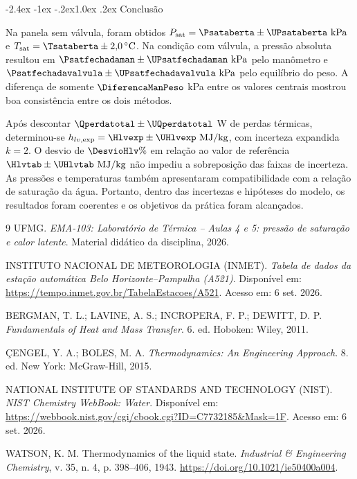\documentclass[11pt,a4paper]{article}
\makeatletter
\renewcommand\section{\@startsection{section}{1}{\z@}%
  {-2.4ex \@plus -1ex \@minus -.2ex}{1.0ex \@plus .2ex}%
  {\normalfont\large\bfseries\color{petrol}}}
\newcommand{\Psat}{P_{\mathrm{sat}}}
\newcommand{\Tsat}{T_{\mathrm{sat}}}
\makeatother
\begin{document}
\clearpage
\section{Conclusão}

Na panela sem válvula, foram obtidos
$\Psat=\Psataberta\pm\UPsataberta\ \mathrm{kPa}$ e
$\Tsat=\Tsataberta\pm2{,}0\,^{\circ}\mathrm{C}$. Na condição com válvula, a
pressão absoluta resultou em
$\Psatfechadaman\pm\UPsatfechadaman\ \mathrm{kPa}$ pelo manômetro e
$\Psatfechadavalvula\pm\UPsatfechadavalvula\ \mathrm{kPa}$ pelo equilíbrio do
peso. A diferença de somente $\DiferencaManPeso$ kPa entre os valores centrais
mostrou boa consistência entre os dois métodos.

Após descontar $\Qperdatotal\pm\UQperdatotal$ W de perdas térmicas, determinou-se
$h_{lv,\mathrm{exp}}=\Hlvexp\pm\UHlvexp\ \mathrm{MJ/kg}$, com incerteza expandida
$k=2$. O desvio de $\DesvioHlv\%$ em relação ao valor de referência
$\Hlvtab\pm\UHlvtab\ \mathrm{MJ/kg}$ não impediu a sobreposição das faixas de
incerteza. As pressões e temperaturas também apresentaram compatibilidade com a
relação de saturação da água. Portanto, dentro das incertezas e hipóteses do
modelo, os resultados foram coerentes e os objetivos da prática foram
alcançados.

\begin{thebibliography}{9}
UFMG. \textit{EMA-103: Laboratório de Térmica -- Aulas 4 e 5: pressão de
saturação e calor latente}. Material didático da disciplina, 2026.

INSTITUTO NACIONAL DE METEOROLOGIA (INMET). \textit{Tabela de dados da estação
automática Belo Horizonte--Pampulha (A521)}. Disponível em:
\url{https://tempo.inmet.gov.br/TabelaEstacoes/A521}. Acesso em: 6 set. 2026.

BERGMAN, T. L.; LAVINE, A. S.; INCROPERA, F. P.; DEWITT, D. P.
\textit{Fundamentals of Heat and Mass Transfer}. 6. ed. Hoboken: Wiley, 2011.

ÇENGEL, Y. A.; BOLES, M. A. \textit{Thermodynamics: An Engineering Approach}.
8. ed. New York: McGraw-Hill, 2015.

NATIONAL INSTITUTE OF STANDARDS AND TECHNOLOGY (NIST). \textit{NIST Chemistry
WebBook: Water}. Disponível em:
\url{https://webbook.nist.gov/cgi/cbook.cgi?ID=C7732185\&Mask=1F}.
Acesso em: 6 set. 2026.

WATSON, K. M. Thermodynamics of the liquid state. \textit{Industrial \&
Engineering Chemistry}, v. 35, n. 4, p. 398--406, 1943.
\url{https://doi.org/10.1021/ie50400a004}.
\end{thebibliography}
\end{document}
